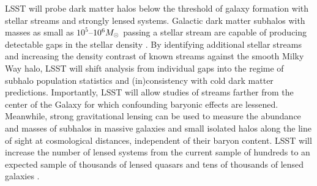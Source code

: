 \documentclass[12pt]{article}
\begin{document}
LSST will probe dark matter halos below the threshold of galaxy formation with stellar streams and strongly lensed systems.
Galactic dark matter subhalos with masses as small as $10^5$--$10^6 M_\odot$ passing a stellar stream are capable of producing detectable gaps in the stellar density \citep[][]{erkal2016,bovy:2017}.
By identifying additional stellar streams and increasing the density contrast of known streams against the smooth Milky Way halo, LSST will shift analysis from individual gaps into the regime of subhalo population statistics and (in)consistency with cold dark matter predictions.
Importantly, LSST will allow studies of streams farther from the center of the Galaxy for which confounding baryonic effects are lessened.
Meanwhile, strong gravitational lensing can be used to measure the abundance and masses of subhalos in massive galaxies and small isolated halos along the line of sight at cosmological distances, independent of their baryon content.
LSST will increase the number of lensed systems from the current sample of hundreds to an expected sample of thousands of lensed quasars \citep{O+M10} and tens of thousands of lensed galaxies \citep{Collett2015}.
\end{document}
